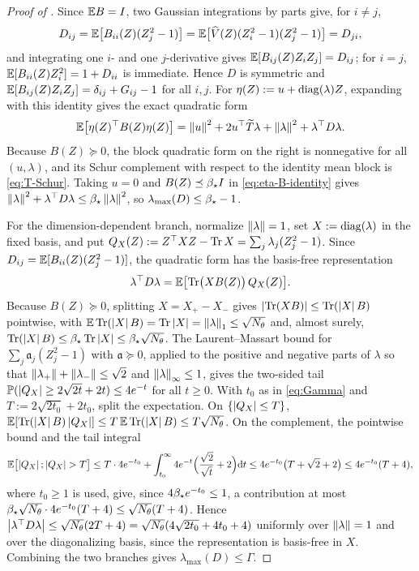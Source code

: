 \begin{proof}[Proof of ]
Since $\mathbb{E} B=I$, two Gaussian integrations by parts give, for $i\neq j$,
\[
    D_{ij}=\mathbb{E}\bigl[B_{ii}(Z)(Z_j^2-1)\bigr]
    =\mathbb{E}\bigl[\widehat V(Z)(Z_i^2-1)(Z_j^2-1)\bigr]=D_{ji},
\]
and integrating one $i$- and one $j$-derivative gives $\mathbb{E}[B_{ij}(Z)Z_iZ_j]=D_{ij}$; for $i=j$,
$\mathbb{E}[B_{ii}(Z)Z_i^2]=1+D_{ii}$ is immediate. Hence $D$ is symmetric and
$\mathbb{E}[B_{ij}(Z)Z_iZ_j]=\delta_{ij}+G_{ij}-1$ for all $i,j$. For $\eta(Z):=u+\operatorname{diag}(\lambda)Z$,
expanding with this identity gives the exact quadratic form
\begin{equation}
\label{eq:eta-B-identity}
    \mathbb{E}\bigl[\eta(Z)^\top B(Z)\eta(Z)\bigr]
    =\left\lVert u\right\rVert^2+2u^\top\widetilde T\lambda+\left\lVert \lambda\right\rVert^2+\lambda^\top D\lambda .
\end{equation}
Because $B(Z)\succeq0$, the block quadratic form on the right is nonnegative for all
$(u,\lambda)$, and its Schur complement with respect to the identity mean block is
\eqref{eq:T-Schur}. Taking $u=0$ and $B(Z)\preceq\beta_\star I$ in \eqref{eq:eta-B-identity}
gives $\left\lVert \lambda\right\rVert^2+\lambda^\top D\lambda\leq\beta_\star\left\lVert \lambda\right\rVert^2$, so
$\lambda_{\max}(D)\leq\beta_\star-1$.

For the dimension-dependent branch, normalize $\left\lVert \lambda\right\rVert=1$, set $X:=\operatorname{diag}(\lambda)$ in the
fixed basis, and put $Q_X(Z):=Z^\top XZ-\operatorname{Tr} X=\sum_j\lambda_j(Z_j^2-1)$. Since
$D_{ij}=\mathbb{E}[B_{ii}(Z)(Z_j^2-1)]$, the quadratic form has the basis-free representation
\[
    \lambda^\top D\lambda=\mathbb{E}\bigl[\operatorname{Tr}\bigl(XB(Z)\bigr)\,Q_X(Z)\bigr].
\]
Because $B(Z)\succeq0$, splitting $X=X_+-X_-$ gives $\left\lvert \operatorname{Tr}(XB)\right\rvert\leq\operatorname{Tr}(\left\lvert X\right\rvert B)$ pointwise,
with $\mathbb{E}\operatorname{Tr}(\left\lvert X\right\rvert B)=\operatorname{Tr}\left\lvert X\right\rvert=\left\lVert \lambda\right\rVert_1\leq\sqrt{N_\theta}$ and, almost surely,
$\operatorname{Tr}(\left\lvert X\right\rvert B)\leq\beta_\star\operatorname{Tr}\left\lvert X\right\rvert\leq\beta_\star\sqrt{N_\theta}$. The Laurent--Massart bound
\citep{laurent2000adaptive}
for $\sum_j\mathfrak a_j(Z_j^2-1)$ with $\mathfrak a\succeq0$, applied to the positive and
negative parts of $\lambda$ so that $\left\lVert \lambda_+\right\rVert+\left\lVert \lambda_-\right\rVert\leq\sqrt2$ and
$\left\lVert \lambda\right\rVert_\infty\leq1$, gives the two-sided tail
$\mathbb{P}(\left\lvert Q_X\right\rvert\geq2\sqrt{2t}+2t)\leq4e^{-t}$ for all $t\geq0$. With $t_0$ as in
\eqref{eq:Gamma} and $T:=2\sqrt{2t_0}+2t_0$, split the expectation. On $\{\left\lvert Q_X\right\rvert\leq T\}$,
$\mathbb{E}[\operatorname{Tr}(\left\lvert X\right\rvert B)\left\lvert Q_X\right\rvert]\leq T\,\mathbb{E}\operatorname{Tr}(\left\lvert X\right\rvert B)\leq T\sqrt{N_\theta}$. On the complement, the
pointwise bound and the tail integral
\[
    \mathbb{E}\bigl[\left\lvert Q_X\right\rvert;\left\lvert Q_X\right\rvert>T\bigr]
    \leq T\cdot4e^{-t_0}+\int_{t_0}^\infty4e^{-t}\Bigl(\frac{\sqrt2}{\sqrt t}+2\Bigr)\mathrm{d} t
    \leq4e^{-t_0}\bigl(T+\sqrt2+2\bigr)\leq4e^{-t_0}(T+4),
\]
where $t_0\geq1$ is used, give, since $4\beta_\star e^{-t_0}\leq1$, a contribution at most
$\beta_\star\sqrt{N_\theta}\cdot4e^{-t_0}(T+4)\leq\sqrt{N_\theta}(T+4)$. Hence
$\left\lvert \lambda^\top D\lambda\right\rvert\leq\sqrt{N_\theta}(2T+4)=\sqrt{N_\theta}(4\sqrt{2t_0}+4t_0+4)$
uniformly over $\left\lVert \lambda\right\rVert=1$ and over the diagonalizing basis, since the representation is
basis-free in $X$. Combining the two branches gives $\lambda_{\max}(D)\leq\Gamma$.
\end{proof}

